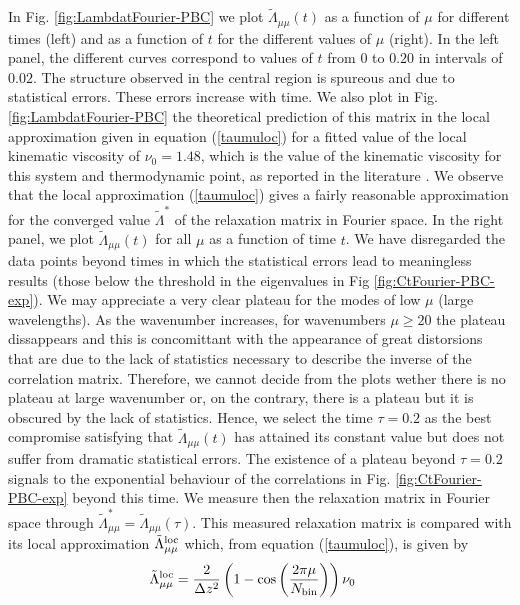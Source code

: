 \documentclass[b5paper,openright,10pt]{book}
\begin{document}
In       Fig.         \ref{fig:LambdatFourier-PBC}       we       plot
$\tilde{\Lambda}_{\mu\mu}(t)$  as a  function of  $\mu$ for  different
times (left) and as a function of $t$ for the different values of $\mu$
(right). In the left panel,  the different curves correspond to values
of  $t$ from  $0$ to  $0.20$ in  intervals of  $0.02$.  The  structure
observed  in the  central region  is spureous  and due  to statistical
errors.   These   errors  increase  with   time.   We  also   plot  in
Fig. \ref{fig:LambdatFourier-PBC}  the theoretical prediction  of this
matrix in the local approximation  given in equation (\ref{taumuloc}) for a
fitted value  of the  local kinematic  viscosity of  $\nu_0=1.48$, which is the value of the kinematic viscosity for this system and thermodynamic point, as reported in the literature \cite{Woodcock2006}. We
observe that  the local approximation (\ref{taumuloc})  gives a fairly
reasonable approximation  for the converged  value $\tilde{\Lambda}^*$
of the  relaxation matrix in Fourier  space.  In the right  panel, we
plot $\tilde{\Lambda}_{\mu\mu}(t)$ for all $\mu$ as a function of time
$t$.  We  have disregarded the data  points beyond times in  which the
statistical  errors  lead  to  meaningless results  (those  below  the
threshold  in  the  eigenvalues  in Fig  \ref{fig:CtFourier-PBC-exp}).   We  may
appreciate a  very clear  plateau for  the modes  of low  $\mu$ (large
wavelengths).  As the wavenumber increases, for wavenumbers $\mu\ge20$
the plateau dissappears  and this is concomittant  with the appearance
of great distorsions that are due  to the lack of statistics necessary
to describe  the inverse  of the correlation matrix.  Therefore, we  cannot decide
from the plots  wether there is no plateau at  large wavenumber or, on
the contrary,  there is a  plateau but it is  obscured by the  lack of
statistics. 
Hence, we select the  time $\tau=0.2$ as
the best compromise  satisfying that $\tilde{\Lambda}_{\mu\mu}(t)$ has
attained  its  constant  value  but  does  not  suffer  from  dramatic
statistical errors.     The existence  of a  plateau
beyond  $\tau=0.2$  signals  to   the  exponential  behaviour  of  the
correlations  in  Fig.   \ref{fig:CtFourier-PBC-exp}  beyond  this  time.   We
measure  then   the  relaxation   matrix  in  Fourier   space  through
$\tilde{\Lambda}^*_{\mu\mu}=\tilde{\Lambda}_{\mu\mu}(\tau)$.      This
measured relaxation  matrix is  compared with its  local approximation
$\tilde{\Lambda}^{\rm loc}_{\mu\mu}$ which, from equation (\ref{taumuloc}),
is given by
\begin{align}
\tilde{\Lambda}^{\rm loc}_{\mu\mu}&=\frac{2}{\Delta z^2}
\left(1-\cos\left( \frac{2\pi \mu}{N_{\rm bin}}\right)\right)
\nu_0
\label{Lambdaloc}
\end{align}
\end{document}
